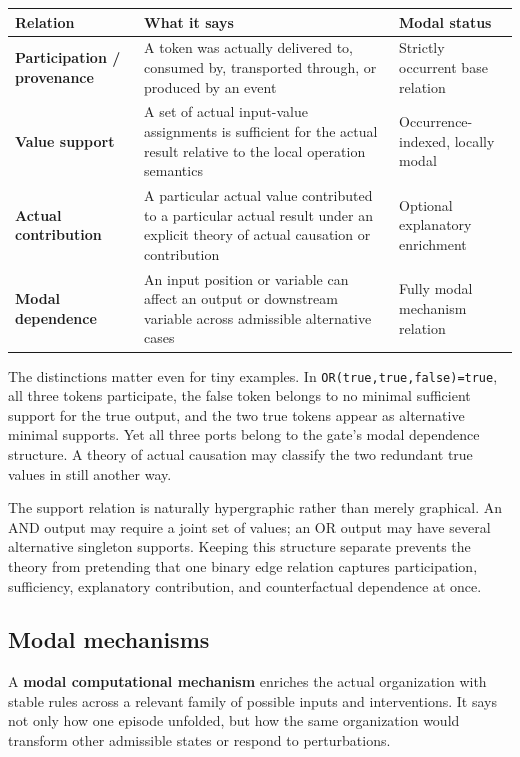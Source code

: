 \documentclass[11pt,a4paper]{article}
\begin{document}
\begin{center}
\begin{tabularx}{\textwidth}{>{\RaggedRight\arraybackslash\bfseries}p{33mm}>{\RaggedRight\arraybackslash}X>{\RaggedRight\arraybackslash}X}
\toprule
Relation & What it says & Modal status \\
\midrule
Participation / provenance & A token was actually delivered to, consumed by, transported through, or produced by an event & Strictly occurrent base relation \\
Value support & A set of actual input-value assignments is sufficient for the actual result relative to the local operation semantics & Occurrence-indexed, locally modal \\
Actual contribution & A particular actual value contributed to a particular actual result under an explicit theory of actual causation or contribution & Optional explanatory enrichment \\
Modal dependence & An input position or variable can affect an output or downstream variable across admissible alternative cases & Fully modal mechanism relation \\
\bottomrule
\end{tabularx}
\end{center}

The distinctions matter even for tiny examples. In \texttt{OR(true,true,false)=true}, all three tokens participate, the false token belongs to no minimal sufficient support for the true output, and the two true tokens appear as alternative minimal supports. Yet all three ports belong to the gate's modal dependence structure. A theory of actual causation may classify the two redundant true values in still another way.

The support relation is naturally hypergraphic rather than merely graphical. An AND output may require a joint set of values; an OR output may have several alternative singleton supports. Keeping this structure separate prevents the theory from pretending that one binary edge relation captures participation, sufficiency, explanatory contribution, and counterfactual dependence at once.

\subsection{Modal mechanisms}

A \textbf{modal computational mechanism} enriches the actual organization with stable rules across a relevant family of possible inputs and interventions. It says not only how one episode unfolded, but how the same organization would transform other admissible states or respond to perturbations.
\end{document}
